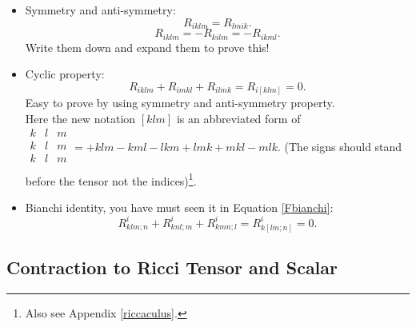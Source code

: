 \documentclass[openany,10pt]{book}
\theoremstyle{definition}
\theoremstyle{definition}
\theoremstyle{remark}
\begin{document}
\begin{itemize}
\item Symmetry and anti-symmetry:\\
\begin{equation}
    R_{iklm}=R_{lmik}.
\end{equation}
\begin{equation}
     R_{iklm}=- R_{kilm}=- R_{ikml}.
\end{equation}
Write them down and expand them to prove this!
    \item Cyclic property:\\
    \begin{equation}
         R_{iklm}+ R_{imkl}+ R_{ilmk}=R_{i[klm]}=0.
    \end{equation}
    Easy to prove by using symmetry and anti-symmetry property.\\
    Here the new notation $[klm]$ is an abbreviated form of  $\begin{array}{|ccc|}
         k &l &m  \\
         k &l &m \\
        k &l &m\\
    \end{array}=+klm-kml-lkm+lmk+mkl-mlk$. (The signs should stand before the tensor not the indices)\footnote{Also see Appendix \ref{riccaculus}.}. 
    \item Bianchi identity, you have must seen it in Equation \ref{Fbianchi}:\\
    \begin{equation}\label{Gbianchi}
         R^i_{klm;n}+R^i_{knl;m}+R^i_{kmn;l}=R^i_{k[lm;n]}=0.
    \end{equation}
\end{itemize}

\subsection{Contraction to Ricci Tensor and Scalar}
\end{document}
